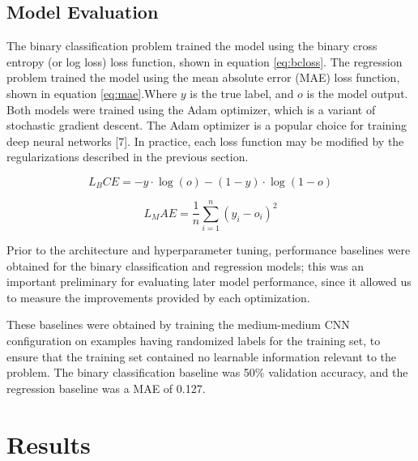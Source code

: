\documentclass[10pt]{article}
\begin{document}


\subsection{Model Evaluation}

The binary classification problem trained the model using the binary cross entropy
(or log loss) loss function, shown in equation \ref{eq:bcloss}. The regression problem
trained the model using the mean absolute error (MAE) loss function, shown in
equation \ref{eq:mae}.Where $y$ is the true label, and $o$ is the model output.
Both models were trained using the Adam optimizer, which is a variant of stochastic
gradient descent. The Adam optimizer is a popular choice for training deep neural
networks [7]. In practice, each loss function may be modified by the
regularizations described in the previous section.

\begin{minipage}{0.45\linewidth}
  \begin{equation}\label{eq:bcloss}
    L_BCE = -y \cdot \log(o) - (1-y) \cdot \log(1-o)
  \end{equation}
\end{minipage}
\hfill
\begin{minipage}{0.45\linewidth}
  \begin{equation}\label{eq:mae}
    L_MAE = \frac{1}{n} \sum_{i=1}^{n} (y_i - o_i)^2
  \end{equation}
\end{minipage}

Prior to the architecture and hyperparameter tuning, performance baselines were
obtained for the binary classification and regression models; this was an
important preliminary for evaluating later model performance, since it allowed us to
measure the improvements provided by each optimization.

These baselines were obtained by training the medium-medium CNN configuration
on examples having randomized labels for the training set, to ensure that
the training set contained no learnable information relevant to the problem.
The binary classification baseline was 50\% validation accuracy, and the
regression baseline was a MAE of 0.127.

\section{Results}
\end{document}
